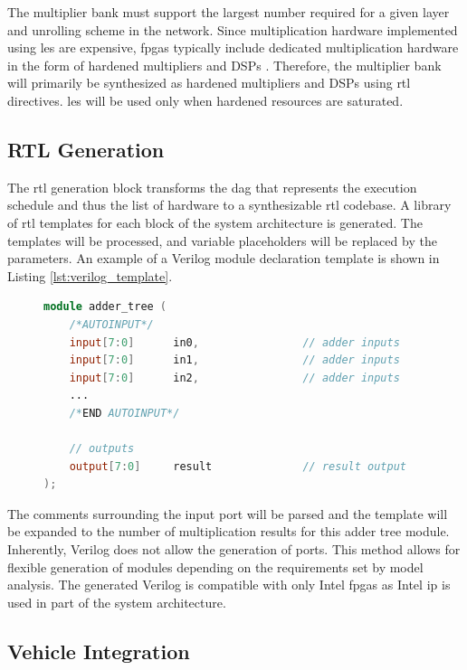 \documentclass{uw-ece-wkrpt}
\begin{document}
The multiplier bank must support the largest number required for a given layer and unrolling scheme in the network. Since multiplication hardware implemented using \glspl{le} are expensive, \glspl{fpga} typically include dedicated multiplication hardware in the form of hardened multipliers and DSPs \cite{Intel-Corp.2018IntelR-ArriaR-1}. Therefore, the multiplier bank will primarily be synthesized as hardened multipliers and DSPs using \gls{rtl} directives. \Glspl{le} will be used only when hardened resources are saturated.

\subsection{RTL Generation}\label{sec:rtl_gen}

The \gls{rtl} generation block transforms the \gls{dag} that represents the execution schedule and thus the list of hardware to a synthesizable \gls{rtl} codebase. A library of \gls{rtl} templates for each block of the system architecture is generated. The templates will be processed, and variable placeholders will be replaced by the parameters. An example of a Verilog module declaration template is shown in Listing \ref{lst:verilog_template}.

\begin{figure}
\centering
\begin{lstlisting}[caption={Verilog template}, label=lst:verilog_template, language=Verilog]
module adder_tree (
    /*AUTOINPUT*/
    input[7:0]      in0,                // adder inputs
    input[7:0]      in1,                // adder inputs
    input[7:0]      in2,                // adder inputs
    ...
    /*END AUTOINPUT*/

    // outputs
    output[7:0]     result              // result output
);
\end{lstlisting}
\end{figure}

The comments surrounding the input port will be parsed and the template will be expanded to the number of multiplication results for this adder tree module. Inherently, Verilog does not allow the generation of ports. This method allows for flexible generation of modules depending on the requirements set by model analysis. The generated Verilog is compatible with only Intel \glspl{fpga} as Intel \gls{ip} is used in part of the system architecture.

\subsection{Vehicle Integration}
\end{document}
